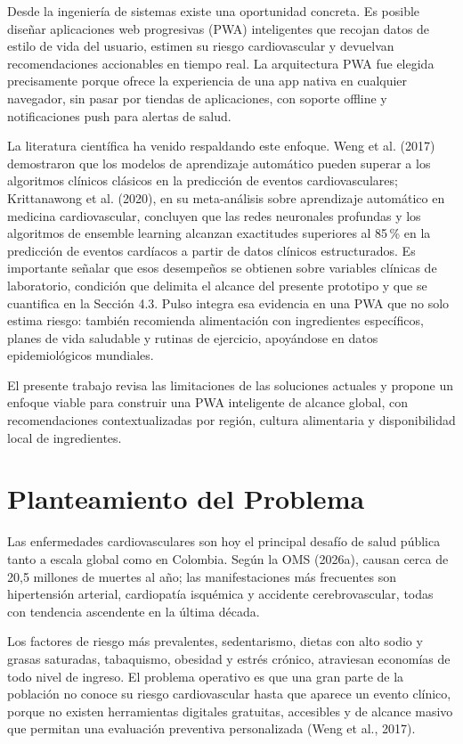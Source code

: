 \documentclass[12pt,letterpaper]{article}
\begin{document}
Desde la ingeniería de sistemas existe una oportunidad concreta. Es posible
diseñar aplicaciones web progresivas (PWA) inteligentes que recojan datos de
estilo de vida del usuario, estimen su riesgo cardiovascular y devuelvan
recomendaciones accionables en tiempo real. La arquitectura PWA fue elegida
precisamente porque ofrece la experiencia de una app nativa en cualquier
navegador, sin pasar por tiendas de aplicaciones, con soporte offline y
notificaciones push para alertas de salud.

La literatura científica ha venido respaldando este enfoque. Weng et al. (2017)
demostraron que los modelos de aprendizaje automático pueden superar a los
algoritmos clínicos clásicos en la predicción de eventos cardiovasculares;
Krittanawong et al. (2020), en su meta-análisis sobre aprendizaje automático en
medicina cardiovascular, concluyen que las redes neuronales profundas y los
algoritmos de ensemble learning alcanzan exactitudes superiores al 85\,\% en la
predicción de eventos cardíacos a partir de datos clínicos estructurados. Es
importante señalar que esos desempeños se obtienen sobre variables clínicas de
laboratorio, condición que delimita el alcance del presente prototipo y que se
cuantifica en la Sección 4.3. Pulso integra esa evidencia en una PWA
que no solo estima riesgo: también recomienda alimentación con ingredientes
específicos, planes de vida saludable y rutinas de ejercicio, apoyándose en datos
epidemiológicos mundiales.

El presente trabajo revisa las limitaciones de las soluciones actuales y propone
un enfoque viable para construir una PWA inteligente de alcance global, con
recomendaciones contextualizadas por región, cultura alimentaria y disponibilidad
local de ingredientes.

\newpage

\section{Planteamiento del Problema}

Las enfermedades cardiovasculares son hoy el principal desafío de salud pública
tanto a escala global como en Colombia. Según la OMS (2026a), causan cerca de
20,5 millones de muertes al año; las manifestaciones más frecuentes son
hipertensión arterial, cardiopatía isquémica y accidente cerebrovascular, todas
con tendencia ascendente en la última década.

Los factores de riesgo más prevalentes, sedentarismo, dietas con alto sodio y
grasas saturadas, tabaquismo, obesidad y estrés crónico, atraviesan economías de
todo nivel de ingreso. El problema operativo es que una gran parte de la
población no conoce su riesgo cardiovascular hasta que aparece un evento clínico,
porque no existen herramientas digitales gratuitas, accesibles y de alcance
masivo que permitan una evaluación preventiva personalizada (Weng et al., 2017).
\end{document}
